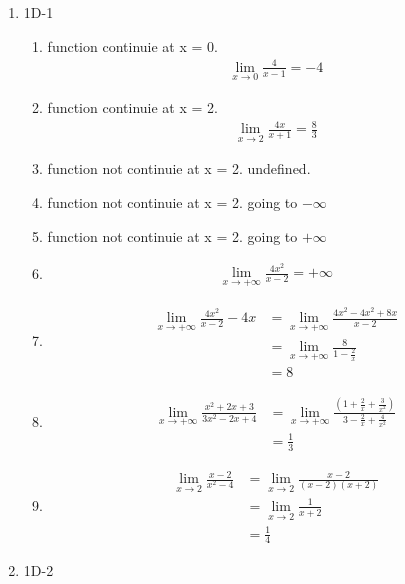 \documentclass{article}
\begin{document}
\begin{enumerate}
\item 1D-1
    \begin{enumerate}
        \item function continuie at x = 0.
        \begin{align*}
            \lim_{x \to 0} \frac{4}{x-1} = -4
        \end{align*}
        \item function continuie at x = 2.
        \begin{align*}
            \lim_{x \to 2} \frac{4x}{x+1} = \frac{8}{3}
        \end{align*}
        \item function not continuie at x = 2. undefined. 
        \item function not continuie at x = 2. going to $-\infty$ 
        \item function not continuie at x = 2. going to $+\infty$
        \item  
        \begin{align*}
            \lim_{x \to +\infty} \frac{4x^2}{x-2} = +\infty
        \end{align*}
        \item 
        \begin{align*}
            \lim_{x \to +\infty} \frac{4x^2}{x-2} - 4x &= \lim_{x \to +\infty} \frac{4x^2 - 4x^2 + 8x}{x-2} \\
            &= \lim_{x \to +\infty} \frac{8}{1-\frac{2}{x}} \\
            &= 8
        \end{align*}
        \item 
        \begin{align*}
            \lim_{x \to +\infty} \frac{x^2+2x+3}{3x^2-2x+4} &= \lim_{x \to +\infty} \frac{(1+\frac{2}{x}+\frac{3}{x^2})}{3 - \frac{2}{x} + \frac{4}{x^2}} \\
            &= \frac{1}{3}
        \end{align*}
        \item 
        \begin{align*}
            \lim_{x \to 2} \frac{x-2}{x^2-4} &= \lim_{x \to 2} \frac{x-2}{(x-2)(x+2)} \\
            &= \lim_{x \to 2} \frac{1}{x+2} \\
            &= \frac{1}{4}
        \end{align*}
    \end{enumerate}
\item 1D-2

\end{enumerate}
\end{document}
